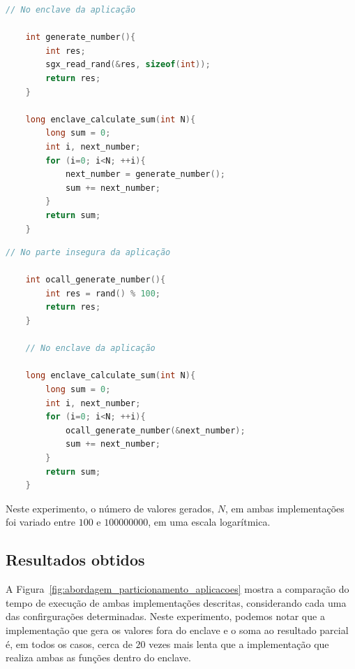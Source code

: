 \begin{lstlisting}[language=C, label=lst:particionamento_aplicacoes_enclave,
    caption={Pseudocódigo do experimento de particionamento de aplicações, com
    todas as tarefas executadas no enclave.}]
    // No enclave da aplicação
    
    int generate_number(){
        int res;
        sgx_read_rand(&res, sizeof(int));
        return res;
    }
        
    long enclave_calculate_sum(int N){
        long sum = 0;
        int i, next_number;
        for (i=0; i<N; ++i){
            next_number = generate_number();
            sum += next_number;
        }
        return sum;
    }
\end{lstlisting}
\begin{lstlisting}[language=C, label=lst:particionamento_aplicacoes_mista,
caption={Pseudocódigo do experimento de particionamento de aplicações, com as
tarefas separadas entre o enclave e a parte insegura.}]
    // No parte insegura da aplicação
    
    int ocall_generate_number(){
        int res = rand() % 100;
        return res;
    }

    // No enclave da aplicação

    long enclave_calculate_sum(int N){
        long sum = 0;
        int i, next_number;
        for (i=0; i<N; ++i){
            ocall_generate_number(&next_number);
            sum += next_number;
        }
        return sum;
    }
\end{lstlisting}

Neste experimento, o número de valores gerados, $N$, em ambas implementações foi
variado entre $100$ e $100000000$, em uma escala logarítmica.

\subsection*{Resultados obtidos}

A Figura~\ref{fig:abordagem_particionamento_aplicacoes} mostra a comparação do
tempo de execução de ambas implementações descritas, considerando cada uma das
confirgurações determinadas. Neste experimento, podemos notar que a
implementação que gera os valores fora do enclave e o soma ao resultado parcial
é, em todos os casos, cerca de $20$ vezes mais lenta que a implementação que
realiza ambas as funções dentro do enclave.

